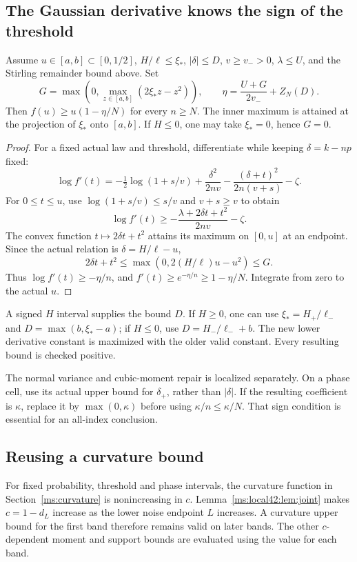 \subsection{The Gaussian derivative knows the sign of the threshold}
\begin{lemma}\label{ms:local42:lem:mid}
Assume $u\in[a,b]\subset[0,1/2]$, $H/\ell\le \xi_*$, $|\delta|\le D$,
$v\ge v_->0$, $\lambda\le U$, and the Stirling remainder bound above.
Set
\[
 G=\max\left(0,\max_{z\in[a,b]}(2\xi_*z-z^2)\right),\qquad
 \eta=\frac{U+G}{2v_-}+Z_N(D).
\]
Then $f(u)\ge u(1-\eta/N)$ for every $n\ge N$.
The inner maximum is attained at the projection of $\xi_*$ onto $[a,b]$.
If $H\le0$, one may take $\xi_*=0$, hence $G=0$.
\end{lemma}
\begin{proof}
For a fixed actual law and threshold, differentiate while keeping
$\delta=k-np$ fixed:
\[
 \log f'(t)=-\tfrac12\log(1+s/v)
       +\frac{\delta^2}{2nv}-\frac{(\delta+t)^2}{2n(v+s)}-\zeta.
\]
For $0\le t\le u$, use $\log(1+s/v)\le s/v$ and $v+s\ge v$ to obtain
\[
 \log f'(t)\ge-\frac{\lambda+2\delta t+t^2}{2nv}-\zeta.
\]
The convex function $t\mapsto2\delta t+t^2$ attains its maximum on
$[0,u]$ at an endpoint. Since the actual relation is $\delta=H/\ell-u$,
\[
 2\delta t+t^2\le\max(0,2(H/\ell)u-u^2)\le G.
\]
Thus $\log f'(t)\ge-\eta/n$, and
$f'(t)\ge e^{-\eta/n}\ge1-\eta/N$. Integrate from zero to the actual $u$.
\end{proof}

A signed $H$ interval supplies the bound $D$. If $H\ge0$,
one can use $\xi_*=H_+/\ell_-$ and $D=\max(b,\xi_*-a)$; if $H\le0$,
use $D=H_-/\ell_-+b$. The new lower derivative constant is maximized with
the older valid constant. Every resulting bound is checked positive.

The normal variance and cubic-moment repair is localized separately.
On a phase cell, use its actual upper bound for $\delta_+$, rather than
$|\delta|$. If the resulting coefficient is $\kappa$, replace it by
$\max(0,\kappa)$ before using $\kappa/n\le\kappa/N$.
That sign condition is essential for an all-index conclusion.

\subsection{Reusing a curvature bound}
For fixed probability, threshold and phase intervals, the curvature
function in Section~\ref{ms:curvature} is nonincreasing in $c$.
Lemma~\ref{ms:local42:lem:joint} makes $c=1-d_L$ increase as the lower
noise endpoint $L$ increases. A curvature upper bound for the first band
therefore remains valid on later bands. The other $c$-dependent moment
and support bounds are evaluated using the value for each band.

